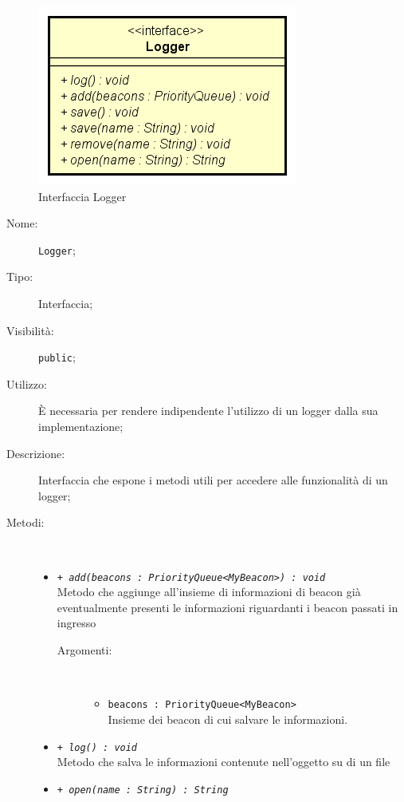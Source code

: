 \documentclass[../DefinizioneDiProdotto.tex]{subfiles}
\begin{document}
    \begin{figure}[H]
        \centering
        \includegraphics{img/Logger.png}
        \caption{Interfaccia Logger}\label{fig:model::beacon::Logger} 
    \end{figure}
    \begin{description}
\item[Nome:] \texttt{Logger};
\item[Tipo:] Interfaccia;
\item[Visibilità:] \texttt{public};
\item[Utilizzo:] È necessaria per rendere indipendente l'utilizzo di un logger dalla sua implementazione;
\item[Descrizione:] Interfaccia che espone i metodi utili per accedere alle funzionalità di un logger;
\item[Metodi:] \
\begin{itemize}
\item \texttt{+ \textit{add(beacons : PriorityQueue<MyBeacon>) : void}}\\
Metodo che aggiunge all'insieme di informazioni di beacon già eventualmente presenti le informazioni riguardanti i beacon passati in ingresso
 \begin{description}
\item[Argomenti:] \
\begin{itemize}
\item \texttt{beacons : PriorityQueue<MyBeacon>}\\
Insieme dei beacon di cui salvare le informazioni.\end{itemize}
\end{description}
\item \texttt{+ \textit{log() : void}}\\
Metodo che salva le informazioni contenute nell'oggetto su di un file
 \item \texttt{+ \textit{open(name : String) : String}}\\

\end{itemize}
\end{description}
\end{document}
